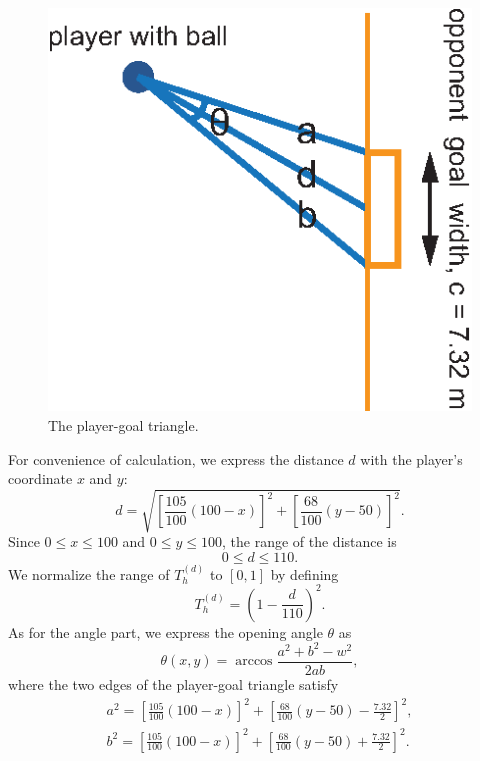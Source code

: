 \documentclass[12pt]{article}
\begin{document}
\begin{itemize}
\begin{itemize}
\begin{itemize}
		\end{itemize}
		\begin{figure}[h]
			\centering
			\includegraphics[scale=1]{FootballField2.eps}
			\caption{The player-goal triangle.}
			\label{The player-goal triangle}
		\end{figure}
		For convenience of calculation, we express the distance $d$ with the player's coordinate $x$ and $y$:
    	\begin{equation}
        d=\sqrt{\left[\frac{105}{100}(100-x)\right]^2+\left[\frac{68}{100}(y-50)\right]^2}.
		\end{equation}
		Since $0\leq x\leq 100$ and $0\leq y\leq 100$, the range of the distance is
   		\begin{equation}
    		0\leq d\leq 110.
		\end{equation}
		We normalize the range of $T_h^{(d)}$ to $[0,1]$ by defining
	    \begin{equation}
    	    T_h^{(d)}=\left(1-\frac{d}{110}\right)^2.
		\end{equation}
		As for the angle part, we express the opening angle $\theta$ as
		\begin{equation}
			\theta(x,y)=\arccos\frac{a^2+b^2-w^2}{2ab},
		\end{equation}
		where the two edges of the player-goal triangle satisfy
		\begin{gather}
        	a^2=\left[\frac{105}{100}(100-x)\right]^2+\left[\frac{68}{100}(y-50)-\frac{7.32}{2}\right]^2,\\
        	b^2=\left[\frac{105}{100}(100-x)\right]^2+\left[\frac{68}{100}(y-50)+\frac{7.32}{2}\right]^2.

\end{gather}
\end{itemize}
\end{itemize}
\end{document}
